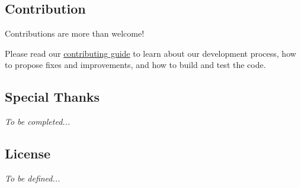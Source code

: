 \subsection*{Contribution}

Contributions are more than welcome!

Please read our \hyperlink{_c_o_n_t_r_i_b_u_t_i_n_g_8md}{contributing guide} to learn about our development process, how to propose fixes and improvements, and how to build and test the code.

\subsection*{Special Thanks}

{\itshape To be completed...}

\subsection*{License}

{\itshape To be defined...} 